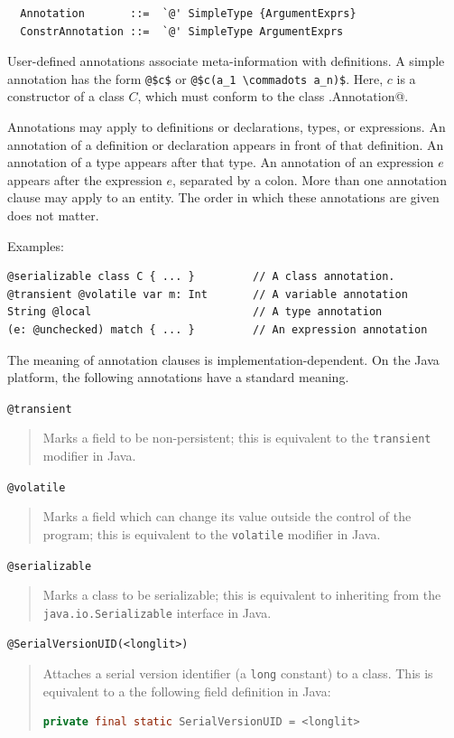 \syntax\begin{lstlisting}
  Annotation       ::=  `@' SimpleType {ArgumentExprs}
  ConstrAnnotation ::=  `@' SimpleType ArgumentExprs
\end{lstlisting}

User-defined annotations associate meta-information with definitions.
A simple annotation has the form \lstinline^@$c$^ or
\lstinline^@$c(a_1 \commadots a_n)$^.  
Here, $c$ is a constructor of a class $C$, which must conform
to the class \lstinline@scala.Annotation@. 

Annotations may apply to definitions or declarations, types, or
expressions.  An annotation of a definition or declaration appears in
front of that definition.  An annotation of a type appears after
that type. An annotation of an expression $e$ appears after the
expression $e$, separated by a colon. More than one annotation clause
may apply to an entity. The order in which these annotations are given
does not matter.

Examples:
\begin{lstlisting}
@serializable class C { ... }         // A class annotation.
@transient @volatile var m: Int       // A variable annotation
String @local                         // A type annotation
(e: @unchecked) match { ... }         // An expression annotation
\end{lstlisting}

The meaning of annotation clauses is implementation-dependent. On the
Java platform, the following annotations have a standard meaning.\bigskip

\lstinline^@transient^
\begin{quote}
Marks a field to be non-persistent; this is
equivalent to the \lstinline^transient^
modifier in Java.
\end{quote}

\lstinline^@volatile^
\begin{quote}Marks a field which can change its value
outside the control of the program; this
is equivalent to the \lstinline^volatile^
modifier in Java.
\end{quote}

\lstinline^@serializable^
\begin{quote}Marks a class to be serializable; this is
equivalent to inheriting from the 
\lstinline^java.io.Serializable^ interface
in Java.
\end{quote}

\lstinline^@SerialVersionUID(<longlit>)^
\begin{quote}Attaches a serial version identifier (a
\lstinline^long^ constant) to a class.
This is equivalent to a the following field
definition in Java:
\begin{lstlisting}[language=Java]
  private final static SerialVersionUID = <longlit> 
\end{lstlisting}
\end{quote}

